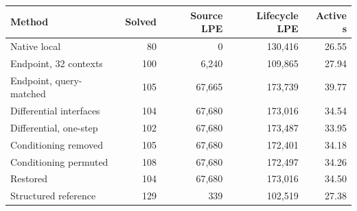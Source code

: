 \begin{tabular}{lrrrr}
\toprule
Method & Solved & Source LPE & Lifecycle LPE & Active s\\
\midrule
Native local & 80 & 0 & 130,416 & 26.55 \\
Endpoint, 32 contexts & 100 & 6,240 & 109,865 & 27.94 \\
Endpoint, query-matched & 105 & 67,665 & 173,739 & 39.77 \\
Differential interfaces & 104 & 67,680 & 173,016 & 34.54 \\
Differential, one-step & 102 & 67,680 & 173,487 & 33.95 \\
Conditioning removed & 105 & 67,680 & 172,401 & 34.18 \\
Conditioning permuted & 108 & 67,680 & 172,497 & 34.26 \\
Restored & 104 & 67,680 & 173,016 & 34.50 \\
Structured reference & 129 & 339 & 102,519 & 27.38 \\
\bottomrule
\end{tabular}

